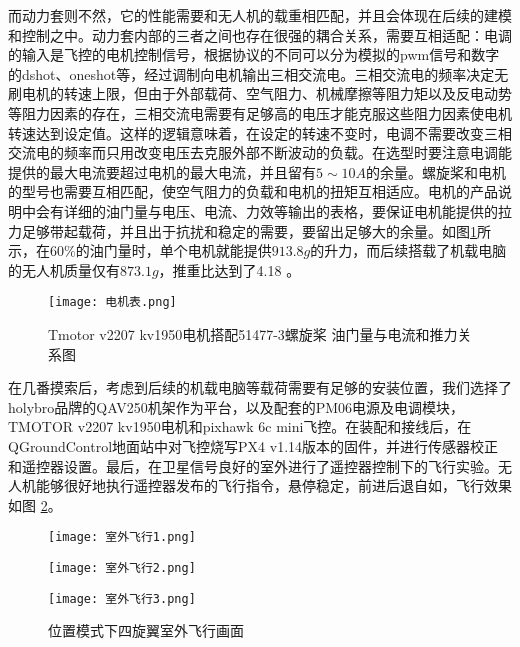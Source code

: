 而动力套则不然，它的性能需要和无人机的载重相匹配，并且会体现在后续的建模和控制之中。动力套内部的三者之间也存在很强的耦合关系，需要互相适配：电调的输入是飞控的电机控制信号，根据协议的不同可以分为模拟的pwm信号和数字的dshot、oneshot等，经过调制向电机输出三相交流电。三相交流电的频率决定无刷电机的转速上限，但由于外部载荷、空气阻力、机械摩擦等阻力矩以及反电动势等阻力因素的存在，三相交流电需要有足够高的电压才能克服这些阻力因素使电机转速达到设定值。这样的逻辑意味着，在设定的转速不变时，电调不需要改变三相交流电的频率而只用改变电压去克服外部不断波动的负载。在选型时要注意电调能提供的最大电流要超过电机的最大电流，并且留有$5\sim 10A$的余量。螺旋桨和电机的型号也需要互相匹配，使空气阻力的负载和电机的扭矩互相适应。电机的产品说明中会有详细的油门量与电压、电流、力效等输出的表格，要保证电机能提供的拉力足够带起载荷，并且出于抗扰和稳定的需要，要留出足够大的余量。如图\ref{电机表}所示，在$60 \%$的油门量时，单个电机就能提供$913.8g$的升力，而后续搭载了机载电脑的无人机质量仅有$873.1g$，推重比达到了4.18 。
\begin{figure}[!h]
  \centering
  \texttt{[image: 电机表.png]}
  \caption{Tmotor v2207 kv1950电机搭配51477-3螺旋桨 油门量与电流和推力关系图 \cite{Tmotor2023}}
  \label{电机表}
\end{figure}

在几番摸索后，考虑到后续的机载电脑等载荷需要有足够的安装位置，我们选择了holybro品牌的QAV250机架作为平台，以及配套的PM06电源及电调模块，TMOTOR v2207 kv1950电机和pixhawk 6c mini飞控。在装配和接线后，在QGroundControl地面站中对飞控烧写PX4 v1.14版本的固件，并进行传感器校正和遥控器设置。最后，在卫星信号良好的室外进行了遥控器控制下的飞行实验。无人机能够很好地执行遥控器发布的飞行指令，悬停稳定，前进后退自如，飞行效果如图 \ref{室外飞行}。

\begin{figure}[h]
  \centering
  \begin{minipage}[c]{0.33\textwidth}
    \centering
    \texttt{[image: 室外飞行1.png]}
  \end{minipage} \hfill
  \begin{minipage}[c]{0.33\textwidth}
    \centering
    \texttt{[image: 室外飞行2.png]}
  \end{minipage}\hfill
    \begin{minipage}[c]{0.33\textwidth}
      \centering
      \texttt{[image: 室外飞行3.png]}
  \end{minipage}
  \caption{位置模式下四旋翼室外飞行画面}
  \label{室外飞行}
  \end{figure}

